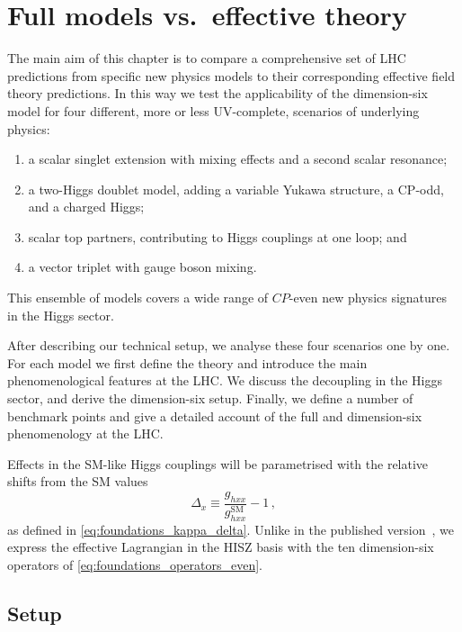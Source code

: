 \section{Full models vs.\ effective theory}
\label{sec:validity_full_vs_effective}

The main aim of this chapter is to compare a comprehensive set of LHC
predictions from specific new physics models to their corresponding
effective field theory predictions. In this way we test the
applicability of the dimension-six model for four different, more or
less UV-complete, scenarios of underlying physics:
%
\begin{enumerate}
\item a scalar singlet extension with mixing effects and a second
  scalar resonance;
\item a two-Higgs doublet model, adding a variable Yukawa structure, a
  CP-odd, and a charged Higgs;
\item scalar top partners, contributing to Higgs couplings at one
  loop; and
\item a vector triplet with gauge boson mixing.
\end{enumerate}
%
This ensemble of models covers a wide range of $CP$-even new physics
signatures in the Higgs sector.

After describing our technical setup, we analyse these four scenarios
one by one. For each model we first define the theory and introduce
the main phenomenological features at the LHC. We discuss the
decoupling in the Higgs sector, and derive the dimension-six
setup. Finally, we define a number of benchmark points and give a
detailed account of the full and dimension-six phenomenology at the
LHC.

Effects in the SM-like Higgs couplings will be parametrised with the
relative shifts from the SM values
%
\begin{equation}
  \Delta_x \equiv \frac {g_{hxx}} {g_{hxx}^{\text{SM}}} - 1\,,
\end{equation}
%
as defined in \autoref{eq:foundations_kappa_delta}. Unlike in the
published version~\cite{Brehmer:2015rna}, we express the effective
Lagrangian in the HISZ basis with the ten dimension-six operators of
\autoref{eq:foundations_operators_even}.



\subsection{Setup}

